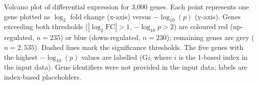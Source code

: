 \caption{Volcano plot of differential expression for 3{,}000 genes. Each point represents one gene plotted as $\log_2$ fold change (x-axis) versus $-\log_{10}(p)$ (y-axis). Genes exceeding both thresholds ($|\log_2\text{FC}|>1$, $-\log_{10}p>2$) are coloured red (up-regulated, $n=235$) or blue (down-regulated, $n=230$); remaining genes are grey ($n=2{,}535$). Dashed lines mark the significance thresholds. The five genes with the highest $-\log_{10}(p)$ values are labelled (G\textit{i}, where $i$ is the 1-based index in the input data). Gene identifiers were not provided in the input data; labels are index-based placeholders.}
